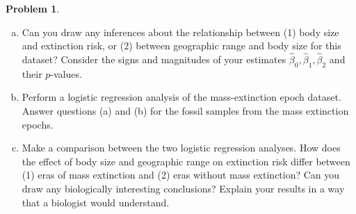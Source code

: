 \documentclass[10pt]{article}
\theoremstyle{definition}
\newtheorem{problem}[theorem]{Problem}
\newcommand{\1}[1]{\textbf{1}_{\left[#1\right]}} %
\begin{document}
\begin{problem}
\begin{enumerate}[(a)]
    \noindent You can view the results of the logistic regression by running:

\begin{verbatim}
  fit_BG
  summary(fit_BG)
\end{verbatim}

    Interpret your results. What is the best fit logistic regression model
    that you got? What were the estimated coefficients. Which estimates were
    statistically significant and which were not? How do you interpret the
    $p$-values?

    \item Can you draw any inferences about the relationship between (1) body
    size and extinction risk, or (2) between geographic range and body size
    for this dataset? Consider the signs and magnitudes of your estimates
    $\widehat{\beta}_{0},\widehat{\beta}_{1},\widehat{\beta}_{2}$ and their
    $p$-values.

    \item Perform a logistic regression analysis of the mass-extinction epoch
    dataset. Answer questions (a) and (b) for the fossil samples from the mass
    extinction epochs.

    \item Make a comparison between the two logistic regression analyses. How
    does the effect of body size and geographic range on extinction risk
    differ between (1) eras of mass extinction and (2) eras without mass
    extinction? Can you draw any biologically interesting conclusions? Explain
    your results in a way that a biologist would understand.
  \end{enumerate}
\end{problem}
\end{document}
